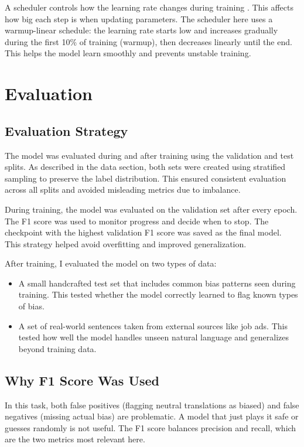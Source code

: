     A scheduler controls how the learning rate changes during training \parencite{mosbachStabilityFinetuningBERT2021}. This affects how big each step is when updating parameters. The scheduler here uses a warmup-linear schedule: the learning rate starts low and increases gradually during the first 10\% of training (warmup), then decreases linearly until the end. This helps the model learn smoothly and prevents unstable training.

\section{Evaluation}
\subsection{Evaluation Strategy}

The model was evaluated during and after training using the validation and test splits. As described in the data section, both sets were created using stratified sampling to preserve the label distribution. This ensured consistent evaluation across all splits and avoided misleading metrics due to imbalance.

During training, the model was evaluated on the validation set after every epoch. The F1 score was used to monitor progress and decide when to stop. The checkpoint with the highest validation F1 score was saved as the final model. This strategy helped avoid overfitting and improved generalization.

After training, I evaluated the model on two types of data:
\begin{itemize}
    \item A small handcrafted test set that includes common bias patterns seen during training. This tested whether the model correctly learned to flag known types of bias.
    \item A set of real-world sentences taken from external sources like job ads. This tested how well the model handles unseen natural language and generalizes beyond training data.
\end{itemize}

\subsection{Why F1 Score Was Used}

In this task, both false positives (flagging neutral translations as biased) and false negatives (missing actual bias) are problematic. A model that just plays it safe or guesses randomly is not useful. The F1 score balances precision and recall, which are the two metrics most relevant here.

